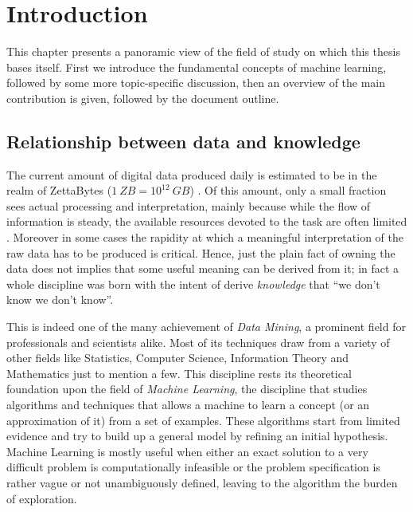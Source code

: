 
\chapter{Introduction} %
\label{Chapter1} %

This chapter presents a panoramic view of the field of study on which this thesis
bases itself.
First we introduce the fundamental concepts of machine learning, followed by
some more topic-specific discussion, then an overview of the main contribution
is given, followed by the document outline.

\section{Relationship between data and knowledge}

The current amount of digital data produced daily is estimated to be in the realm of 
ZettaBytes ($1~ZB = 10^{12}~GB$) \cite{idc}.
Of this amount, only a small fraction sees actual processing and interpretation,
mainly because while the flow of information is steady, the available resources
devoted to the task are often limited \cite{idc}.
Moreover in some cases the rapidity at which a meaningful interpretation of the 
raw data has to be produced is critical.
Hence, just the plain fact of owning the data does not implies that some useful 
meaning can be derived from it; in fact a whole discipline was born with the
intent of derive \emph{knowledge} that ``we don't know we don't know''.

This is indeed one of the many achievement of \emph{Data Mining}, a prominent field for
professionals and scientists alike.
Most of its techniques draw from a variety of other fields like Statistics,
Computer Science, Information Theory and Mathematics just to mention a few.
This discipline rests its theoretical foundation upon the field of \emph{Machine Learning},
the discipline that studies algorithms and techniques that allows a machine
to learn a concept (or an approximation of it) from a set of examples.
These algorithms start from limited evidence and try to build up a general model
by refining an initial hypothesis.
Machine Learning is mostly useful when either an exact solution to a very
difficult problem is computationally infeasible or the problem specification
is rather vague or not unambiguously defined, leaving to the algorithm the burden
of exploration.

